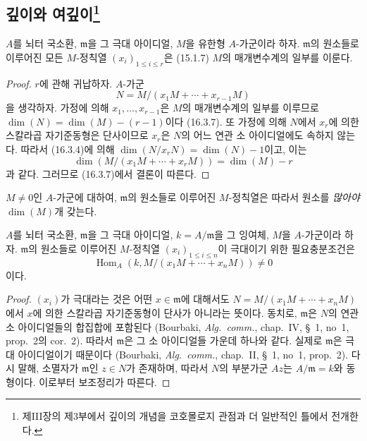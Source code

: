 \subsection[깊이와 여깊이]{깊이와
여깊이\protect\footnote{제III장의 제3부에서 깊이의 개념을 코호몰로지
관점과 더 일반적인 틀에서 전개한다.}}
\label{subsection:0.16.4-fr}

\begin{proposition}[16.4.1]
\label{0.16.4.1-fr}
$A$를 뇌터 국소환, $\mathfrak{m}$을 그 극대 아이디얼, $M$을 유한형
$A$-가군이라 하자. $\mathfrak{m}$의 원소들로 이루어진 모든
$M$-정칙열 $(x_i)_{1\leq i\leq r}$은 (15.1.7) $M$의 매개변수계의
일부를 이룬다.
\end{proposition}

\begin{proof}
$r$에 관해 귀납하자. $A$-가군
\[
  N=M/(x_1M+\cdots+x_{r-1}M)
\]
을 생각하자. 가정에 의해 $x_1,\ldots,x_{r-1}$은 $M$의
매개변수계의 일부를 이루므로 $\dim(N)=\dim(M)-(r-1)$이다
(16.3.7). 또 가정에 의해 $N$에서 $x_r$에 의한 스칼라곱
자기준동형은 단사이므로 $x_r$은 $N$의 어느 연관 소 아이디얼에도
속하지 않는다. 따라서 (16.3.4)에 의해
$\dim(N/x_rN)=\dim(N)-1$이고, 이는
\[
  \dim(M/(x_1M+\cdots+x_rM))=\dim(M)-r
\]
과 같다. 그러므로 (16.3.7)에서 결론이 따른다.
\end{proof}

$M\neq0$인 $A$-가군에 대하여, $\mathfrak{m}$의 원소들로 이루어진
$M$-정칙열은 따라서 원소를 \emph{많아야} $\dim(M)$개 갖는다.

\begin{lemma}[16.4.2]
\label{0.16.4.2-fr}
$A$를 뇌터 국소환, $\mathfrak{m}$을 그 극대 아이디얼,
$k=A/\mathfrak{m}$을 그 잉여체, $M$을 $A$-가군이라 하자.
$\mathfrak{m}$의 원소들로 이루어진 $M$-정칙열
$(x_i)_{1\leq i\leq n}$이 극대이기 위한 필요충분조건은
\[
  \operatorname{Hom}_A(k,M/(x_1M+\cdots+x_nM))\neq0
\]
이다.
\end{lemma}

\begin{proof}
$(x_i)$가 극대라는 것은 어떤 $x\in\mathfrak{m}$에 대해서도
$N=M/(x_1M+\cdots+x_nM)$에서 $x$에 의한 스칼라곱 자기준동형이
단사가 아니라는 뜻이다. 동치로, $\mathfrak{m}$은 $N$의 연관 소
아이디얼들의 합집합에 포함된다 (Bourbaki, \emph{Alg.~comm.},
chap.~IV, \S~1, no~1, prop.~2의 cor.~2). 따라서 $\mathfrak{m}$은
그 소 아이디얼들 가운데 하나와 같다. 실제로 $\mathfrak{m}$은
극대 아이디얼이기 때문이다 (Bourbaki, \emph{Alg.~comm.}, chap.~II,
\S~1, no~1, prop.~2). 다시 말해, 소멸자가 $\mathfrak{m}$인
$z\in N$가 존재하며, 따라서 $N$의 부분가군 $Az$는
$A/\mathfrak{m}=k$와 동형이다. 이로부터 보조정리가 따른다.
\end{proof}

